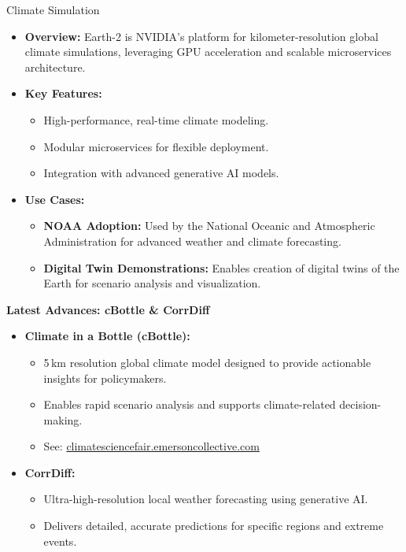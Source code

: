 \begin{frame}[allowframebreaks]{Climate Simulation}
    \begin{itemize}
        \item \textbf{Overview:} Earth-2 is NVIDIA’s platform for kilometer-resolution global climate simulations, leveraging GPU acceleration and scalable microservices architecture.
        \item \textbf{Key Features:}
        \begin{itemize}
            \item High-performance, real-time climate modeling.
            \item Modular microservices for flexible deployment.
            \item Integration with advanced generative AI models.
        \end{itemize}
        \item \textbf{Use Cases:}
        \begin{itemize}
            \item \textbf{NOAA Adoption:} Used by the National Oceanic and Atmospheric Administration for advanced weather and climate forecasting.
            \item \textbf{Digital Twin Demonstrations:} Enables creation of digital twins of the Earth for scenario analysis and visualization.
        \end{itemize}
    \end{itemize}

    \framebreak
    \textbf{Latest Advances: cBottle \& CorrDiff}

    \begin{itemize}
        \item \textbf{Climate in a Bottle (cBottle):}
        \begin{itemize}
            \item 5 km resolution global climate model designed to provide actionable insights for policymakers.
            \item Enables rapid scenario analysis and supports climate-related decision-making.
            \item See: \href{https://climatesciencefair.emersoncollective.com}{climatesciencefair.emersoncollective.com}
        \end{itemize}
        \item \textbf{CorrDiff:}
        \begin{itemize}
            \item Ultra-high-resolution local weather forecasting using generative AI.
            \item Delivers detailed, accurate predictions for specific regions and extreme events.
        \end{itemize}
    \end{itemize}


\end{frame}
